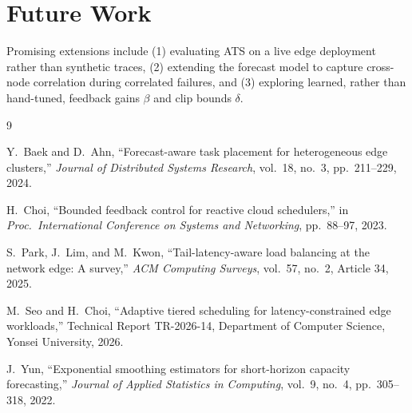 \section{Future Work}

Promising extensions include (1) evaluating ATS on a live edge deployment
rather than synthetic traces, (2) extending the forecast model to capture
cross-node correlation during correlated failures, and (3) exploring
learned, rather than hand-tuned, feedback gains $\beta$ and clip bounds
$\delta$.

\clearpage
\begin{thebibliography}{9}

Y.\ Baek and D.\ Ahn, ``Forecast-aware task placement for heterogeneous
edge clusters,'' \textit{Journal of Distributed Systems Research}, vol.\ 18,
no.\ 3, pp.\ 211--229, 2024.

H.\ Choi, ``Bounded feedback control for reactive cloud schedulers,'' in
\textit{Proc.\ International Conference on Systems and Networking},
pp.\ 88--97, 2023.

S.\ Park, J.\ Lim, and M.\ Kwon, ``Tail-latency-aware load balancing at the
network edge: A survey,'' \textit{ACM Computing Surveys}, vol.\ 57, no.\ 2,
Article 34, 2025.

M.\ Seo and H.\ Choi, ``Adaptive tiered scheduling for latency-constrained
edge workloads,'' Technical Report TR-2026-14, Department of Computer
Science, Yonsei University, 2026.

J.\ Yun, ``Exponential smoothing estimators for short-horizon capacity
forecasting,'' \textit{Journal of Applied Statistics in Computing}, vol.\ 9,
no.\ 4, pp.\ 305--318, 2022.

\end{thebibliography}

\clearpage
\appendix
